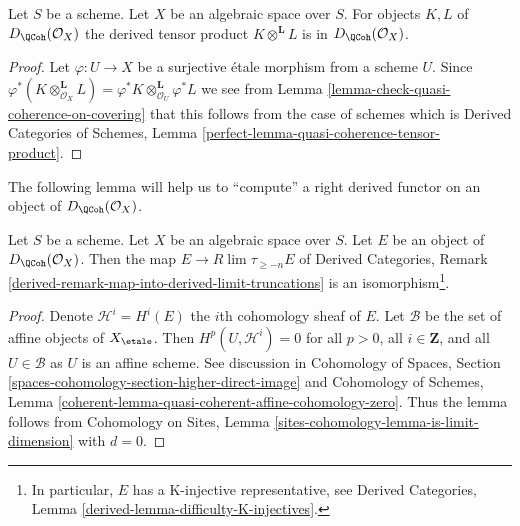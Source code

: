 \begin{lemma}
\label{lemma-quasi-coherence-tensor-product}
Let $S$ be a scheme. Let $X$ be an algebraic space over $S$.
For objects $K, L$ of $D_\QCoh(\mathcal{O}_X)$
the derived tensor product $K \otimes^\mathbf{L} L$ is in
$D_\QCoh(\mathcal{O}_X)$.
\end{lemma}

\begin{proof}
Let $\varphi : U \to X$ be a surjective \'etale morphism from a scheme $U$.
Since
$\varphi^*(K \otimes_{\mathcal{O}_X}^\mathbf{L} L) =
\varphi^*K \otimes_{\mathcal{O}_U}^\mathbf{L} \varphi^*L$
we see from
Lemma \ref{lemma-check-quasi-coherence-on-covering}
that this follows from the case of schemes which is
Derived Categories of Schemes, Lemma
\ref{perfect-lemma-quasi-coherence-tensor-product}.
\end{proof}

\noindent
The following lemma will help us to ``compute'' a right derived functor
on an object of $D_\QCoh(\mathcal{O}_X)$.

\begin{lemma}
\label{lemma-nice-K-injective}
Let $S$ be a scheme. Let $X$ be an algebraic space over $S$. Let $E$ be an
object of $D_\QCoh(\mathcal{O}_X)$. Then the map
$E \to R\lim \tau_{\geq -n}E$ of
Derived Categories, Remark
\ref{derived-remark-map-into-derived-limit-truncations}
is an isomorphism\footnote{In particular,
$E$ has a K-injective representative, see
Derived Categories, Lemma \ref{derived-lemma-difficulty-K-injectives}.}.
\end{lemma}

\begin{proof}
Denote $\mathcal{H}^i = H^i(E)$ the $i$th cohomology sheaf of $E$.
Let $\mathcal{B}$ be the set of affine objects of $X_\etale$.
Then $H^p(U, \mathcal{H}^i) = 0$ for all $p > 0$, all $i \in \mathbf{Z}$,
and all $U \in \mathcal{B}$ as $U$ is an affine scheme.
See discussion in
Cohomology of Spaces, Section
\ref{spaces-cohomology-section-higher-direct-image}
and
Cohomology of Schemes, Lemma
\ref{coherent-lemma-quasi-coherent-affine-cohomology-zero}.
Thus the lemma follows from
Cohomology on Sites, Lemma \ref{sites-cohomology-lemma-is-limit-dimension}
with $d = 0$.
\end{proof}

